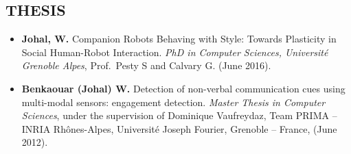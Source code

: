 \vspace{0.1in}

\subsection{THESIS}
\vspace{2pt}

\begin{itemize}[nosep]
    \renewcommand\labelitemi{$\bullet$}
    \item \textbf{Johal, W.} Companion Robots Behaving with Style: Towards Plasticity in Social Human-Robot Interaction. \textit{PhD in Computer Sciences, Université Grenoble Alpes}, Prof.\ Pesty S and Calvary G. (June 2016).
    \item \textbf{Benkaouar (Johal) W.} Detection of non-verbal communication cues using multi-modal sensors: engagement detection. \textit{Master Thesis in Computer Sciences}, under the supervision of Dominique Vaufreydaz, Team PRIMA -- INRIA Rhônes-Alpes, Université Joseph Fourier, Grenoble -- France, (June 2012).
\end{itemize}
